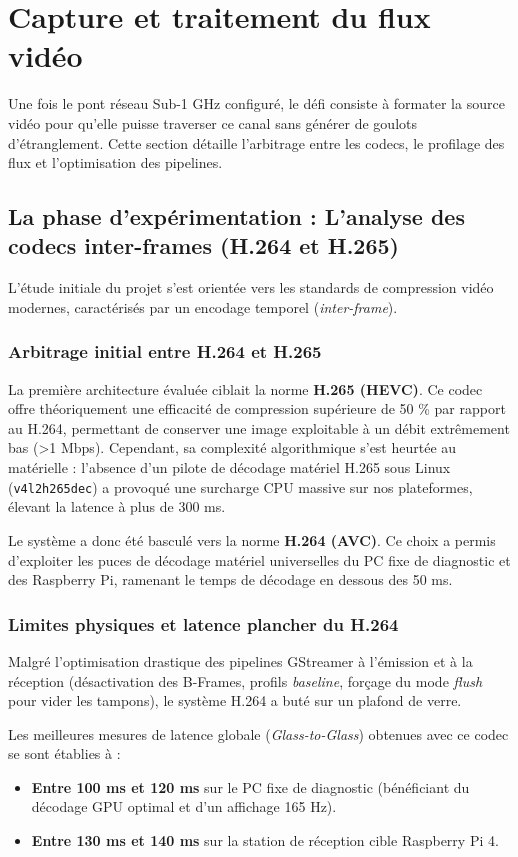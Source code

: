 \section{Capture et traitement du flux vidéo}
Une fois le pont réseau Sub-1 GHz configuré, le défi consiste à formater la source 
vidéo pour qu'elle puisse traverser ce canal sans générer de goulots d'étranglement. Cette 
section détaille l'arbitrage entre les codecs, le profilage des flux et l'optimisation des pipelines.

\subsection{La phase d'expérimentation : L'analyse des codecs inter-frames (H.264 et H.265)}
L'étude initiale du projet s'est orientée vers les standards de compression vidéo modernes, caractérisés par un encodage temporel 
(\textit{inter-frame}).

\subsubsection{Arbitrage initial entre H.264 et H.265}
La première architecture évaluée ciblait la norme \textbf{H.265 (HEVC)}. Ce codec offre théoriquement une 
efficacité de compression supérieure de 50 \% par rapport au H.264, permettant de conserver une image 
exploitable à un débit extrêmement bas (>1 Mbps). Cependant, sa complexité algorithmique s'est heurtée au
 matérielle : l'absence d'un pilote de décodage matériel H.265 sous Linux 
(\texttt{v4l2h265dec}) a provoqué une surcharge CPU massive sur nos plateformes, élevant la latence à plus de 300 ms.

Le système a donc été basculé vers la norme \textbf{H.264 (AVC)}. Ce choix a permis d'exploiter les puces de 
décodage matériel universelles du PC fixe de diagnostic et des Raspberry Pi, ramenant le temps de décodage 
en dessous des 50 ms.

\subsubsection{Limites physiques et latence plancher du H.264}
Malgré l'optimisation drastique des pipelines GStreamer à l'émission et à la réception (désactivation des 
B-Frames, profils \textit{baseline}, forçage du mode \textit{flush} pour vider les tampons), le système 
H.264 a buté sur un plafond de verre. 

Les meilleures mesures de latence globale (\textit{Glass-to-Glass}) obtenues avec ce codec se sont établies à :
\begin{itemize}
    \item \textbf{Entre 100 ms et 120 ms} sur le PC fixe de diagnostic (bénéficiant du décodage GPU optimal et d'un affichage 165 Hz).
    \item \textbf{Entre 130 ms et 140 ms} sur la station de réception cible Raspberry Pi 4.
\end{itemize}

